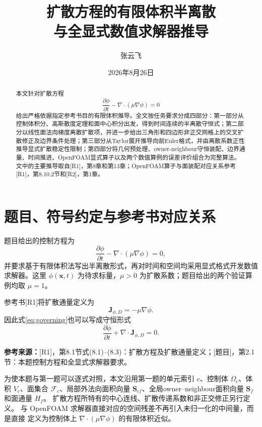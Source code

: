 \documentclass[UTF8,12pt,a4paper]{ctexart}
\title{\bfseries 扩散方程的有限体积半离散\\与全显式数值求解器推导}
\author{张云飞}
\date{2026年8月26日}
\numberwithin{equation}{section}
\newcommand{\Rone}{\textnormal{[R1]}}
\newcommand{\Rtwo}{\textnormal{[R2]}}
\newcommand{\Task}{\textnormal{[题目]}}
\newcommand{\source}[1]{%
  \par\smallskip
  \noindent\colorbox{sourcebg}{%
    \parbox{0.955\linewidth}{\raggedright\footnotesize\color{sourcegray}\textbf{参考来源：}#1}%
  }
  \par\smallskip
}
\newcommand{\Sf}{\bm S}
\newcommand{\xf}{\bm x}
\begin{document}
\maketitle

\begin{abstract}
本文针对扩散方程
\[
  \frac{\partial\phi}{\partial t}-\nabla\cdot(\mu\nabla\phi)=0
\]
给出严格依据指定参考书目的有限体积推导。全文按任务要求分成四部分：第一部分从控制体积分、高斯散度定理和面中心积分出发，得到时间连续的半离散守恒式；第二部分以线性面法向梯度离散扩散项，并进一步给出三角形和四边形非正交网格上的交叉扩散修正及边界条件处理；第三部分从Taylor展开推导向前Euler格式，并由离散系数正性推导显式扩散稳定性限制；第四部分将几何预处理、owner-neighbour守恒装配、边界通量、时间推进、OpenFOAM显式算子以及两个数值算例的误差评价组合为完整算法。文中的主要推导取自\Rone，第8章和第13章；OpenFOAM算子与面装配对应关系参考\Rone，第8.10.2节和\Rtwo，第1章。
\end{abstract}

\tableofcontents
\newpage

\section*{题目、符号约定与参考书对应关系}

题目给出的控制方程为
\begin{equation}
  \frac{\partial\phi}{\partial t}
  -\nabla\cdot(\mu\nabla\phi)=0,
  \label{eq:governing}
\end{equation}
并要求基于有限体积法写出半离散形式，再对时间和空间均采用显式格式开发数值求解器。这里 $\phi(\xf,t)$ 为待求标量，$\mu>0$ 为扩散系数；题目给出的两个验证算例均取 $\mu=1$。

参考书\Rone 将扩散通量定义为
\begin{equation}
  \bm J_{\phi,D}=-\mu\nabla\phi.
  \label{eq:diffusive_flux_definition}
\end{equation}
因此式\eqref{eq:governing}也可以写成守恒形式
\begin{equation}
  \frac{\partial\phi}{\partial t}
  +\nabla\cdot\bm J_{\phi,D}=0.
  \label{eq:conservative_flux_form}
\end{equation}

\source{\Rone，第8.1节式(8.1)--(8.3)：扩散方程及扩散通量定义；\Task，第2.1节：本题控制方程和全显式求解器要求。}

为使本题与第一题可以逐式对照，本文沿用第一题的单元索引 $c$、控制体
$\Omega_c$、体积 $V_c$、面集合 $\mathcal F_c$、局部外法向面积向量
$\Sf_{cf}$、全局owner--neighbour面积向量 $\Sf_f$ 和面通量 $H_f$。
扩散方程所特有的中心连线、扩散传递系数和非正交修正另行定义。
与 OpenFOAM 求解器直接对应的空间残差不再引入未归一化的中间量，而是直接
定义为控制体上 $\nabla\cdot(\mu\nabla\phi)$ 的有限体积近似。
\end{document}

